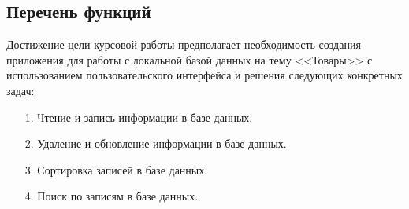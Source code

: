 \subsection{Перечень функций}

Достижение цели курсовой работы предполагает необходимость создания приложения для работы с локальной базой данных на тему <<Товары>> с использованием пользовательского интерфейса и решения следующих конкретных задач:

\begin{enumerate}
    \item [1.] Чтение и запись информации в базе данных.
    \item [2.] Удаление и обновление информации в базе данных.
    \item [3.] Сортировка записей в базе данных.
    \item [4.] Поиск по записям в базе данных.
\end{enumerate}